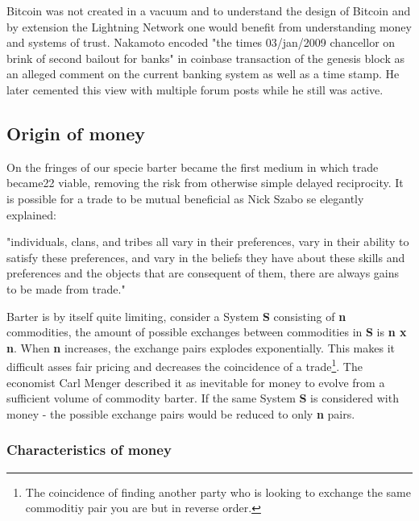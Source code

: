 Bitcoin was not created in a vacuum and to understand the design of Bitcoin and by extension the Lightning Network one would
benefit from understanding money and systems of trust. Nakamoto encoded "the times 03/jan/2009 chancellor on brink of second bailout for banks"\cite{repository:bitcoin:sourceforge}\cite{bitcoin:genesis:coinbase} in coinbase transaction of the genesis block as an alleged comment on the current banking system as well as a time stamp. He later cemented this view with multiple forum posts while he still was active.

\subsection{Origin of money}

On the fringes of our specie barter became the first
medium in which trade became22 viable, removing the risk 
from otherwise simple delayed reciprocity. It is possible
for a trade to be mutual beneficial as Nick Szabo 
se elegantly explained:

\begin{displayquote}

"individuals, clans, and tribes all vary in their preferences, vary in their ability to satisfy these preferences, and vary in the beliefs they have about these skills and preferences and the objects that are consequent of them, there are always gains to be made from trade."\cite{szabo:shelling:out}

\end{displayquote}

Barter is by itself quite limiting, consider a System \textbf{S}
consisting of \textbf{n} commodities, the amount of possible exchanges
between commodities in \textbf{S} is \textbf{n x n}. When \textbf{n} increases, the exchange pairs explodes exponentially.
This makes it difficult asses fair pricing and decreases the coincidence of a trade\footnote{The coincidence of finding another party who is looking to exchange the same commoditiy pair you are but in reverse order.}. 
The economist Carl Menger described it as inevitable for money to evolve from a sufficient volume of
commodity barter\cite{menger:origins:money}. If the same System \textbf{S} is considered with money - the possible exchange pairs would be reduced to only \textbf{n} pairs. 

\subsubsection{Characteristics of money}


